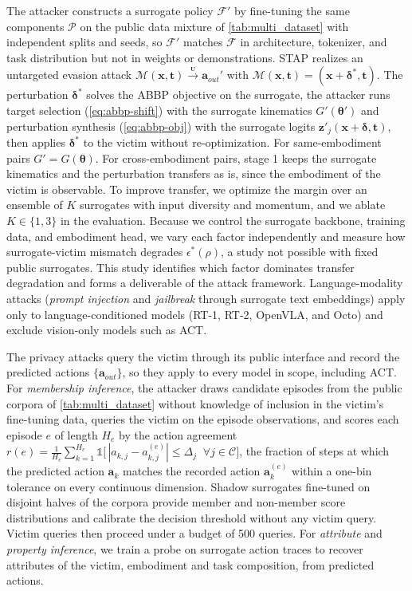 The attacker constructs a surrogate policy $\mathcal{F}'$ by fine-tuning the same components $\mathcal{P}$ on the public data mixture of \autoref{tab:multi_dataset} with independent splits and seeds, so $\mathcal{F}'$ matches $\mathcal{F}$ in architecture, tokenizer, and task distribution but not in weights or demonstrations. 
STAP realizes an untargeted evasion attack $\mathcal{M}(\bm{x},\bm{t})\xrightarrow{{}_{\textbf{U}}}\bm{a}_{out}'$ with $\mathcal{M}(\bm{x},\bm{t})=(\bm{x}+\bm{\delta}^{*},\bm{t})$. The perturbation $\bm{\delta}^{*}$ solves the ABBP objective on the surrogate, \ie the attacker runs target selection (\autoref{eq:abbp-shift}) with the surrogate kinematics $G'(\bm{\theta}')$ and perturbation synthesis (\autoref{eq:abbp-obj}) with the surrogate logits $\bm{z}'_j(\bm{x}+\bm{\delta},\bm{t})$, then applies $\bm{\delta}^{*}$ to the victim without re-optimization. 
For same-embodiment pairs $G'=G(\bm{\theta})$. For cross-embodiment pairs, stage 1 keeps the surrogate kinematics and the perturbation transfers as is, since the embodiment of the victim is observable. To improve transfer, we optimize the margin over an ensemble of $K$ surrogates with input diversity and momentum, and we ablate $K\in\{1,3\}$ in the evaluation. Because we control the surrogate backbone, training data, and embodiment head, we vary each factor independently and measure how surrogate-victim mismatch degrades $\epsilon^{*}(\rho)$, a study not possible with fixed public surrogates. This study identifies which factor dominates transfer degradation and forms a deliverable of the attack framework. Language-modality attacks (\eg \emph{prompt injection} and \emph{jailbreak} through surrogate text embeddings) apply only to language-conditioned models (\ie RT-1, RT-2, OpenVLA, and Octo) and exclude vision-only models such as ACT.

 The privacy attacks query the victim through its public interface and record the predicted actions $\{\bm{a}_{out}\}$, so they apply to every model in scope, including ACT. For \emph{membership inference}, the attacker draws candidate episodes from the public corpora of \autoref{tab:multi_dataset} without knowledge of inclusion in the victim's fine-tuning data, queries the victim on the episode observations, and scores each episode $e$ of length $H_e$ by the action agreement $r(e)=\frac{1}{H_e}\sum_{k=1}^{H_e}\mathbb{1}\bigl[\,|a_{k,j}-a^{(e)}_{k,j}|\le\Delta_j\;\;\forall j\in\mathcal{C}\bigr]$, \ie the fraction of steps at which the predicted action $\bm{a}_k$ matches the recorded action $\bm{a}^{(e)}_k$ within a one-bin tolerance on every continuous dimension. Shadow surrogates fine-tuned on disjoint halves of the corpora provide member and non-member score distributions and calibrate the decision threshold without any victim query. Victim queries then proceed under a budget of 500 queries. For \emph{attribute} and \emph{property inference}, we train a probe on surrogate action traces to recover attributes of the victim, \eg embodiment and task composition, from predicted actions.



